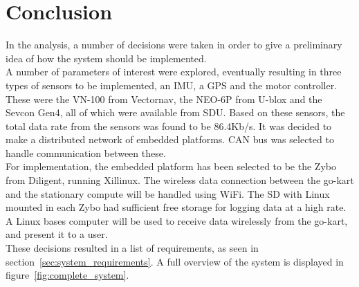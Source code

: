 





\section{Conclusion}
\label{sec:analysisconclusion}
In the analysis, a number of decisions were taken in order to give a preliminary idea of how the system should be implemented. \\

A number of parameters of interest were explored, eventually resulting in three types of sensors to be implemented, an IMU, a GPS and the motor controller.
These were the VN-100 from Vectornav, the NEO-6P from U-blox and the Sevcon Gen4, all of which were available from SDU.
Based on these sensors, the total data rate from the sensors was found to be 86.4Kb/s.
It was decided to make a distributed network of embedded platforms. 
CAN bus was selected to handle communication between these.\\

For implementation, the embedded platform has been selected to be the Zybo from Diligent, running Xillinux.
The wireless data connection between the go-kart and the stationary compute will be handled using WiFi.
The SD with Linux mounted in each Zybo had sufficient free storage for logging data at a high rate.
A Linux bases computer will be used to receive data wirelessly from the go-kart, and present it to a user. \\

These decisions resulted in a list of requirements, as seen in section~\ref{sec:system_requirements}.
A full overview of the system is displayed in figure~\ref{fig:complete_system}.
